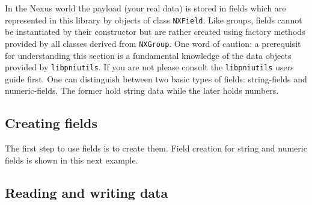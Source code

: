 
In the Nexus world the payload (your real data) is stored in fields which 
are represented in this library by objects of class {\tt NXField}.
Like groups, fields cannot be instantiated by their constructor but are 
rather created using factory methods provided by all classes derived 
from  {\tt NXGroup}. One word of caution: a prerequisit for understanding 
this section is a fundamental knowledge of the data objects provided 
by {\tt libpniutils}. If you are not please consult the {\tt libpniutils}
users guide first.
One can distinguish between two basic types of fields: string-fields
and numeric-fields. The former hold string data while the later 
holds numbers.   

\subsection{Creating fields}

The first step to use fields is to create them. Field creation for 
string and numeric fields is shown in this next example. 




\subsection{Reading and writing data}
